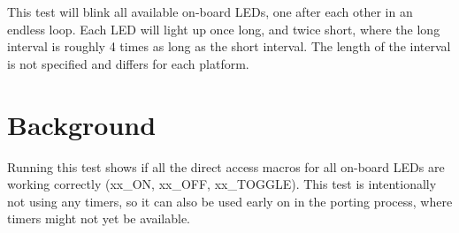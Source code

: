 This test will blink all available on-\/board L\+E\+Ds, one after each other in an endless loop. Each L\+ED will light up once long, and twice short, where the long interval is roughly 4 times as long as the short interval. The length of the interval is not specified and differs for each platform.

\section*{Background }

Running this test shows if all the direct access macros for all on-\/board L\+E\+Ds are working correctly (xx\+\_\+\+ON, xx\+\_\+\+O\+FF, xx\+\_\+\+T\+O\+G\+G\+LE). This test is intentionally not using any timers, so it can also be used early on in the porting process, where timers might not yet be available. 